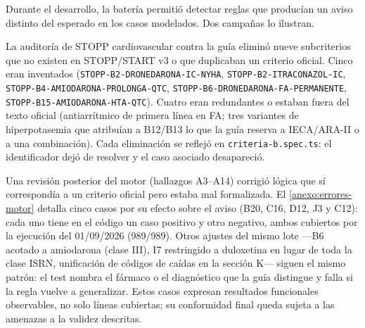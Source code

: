 Durante el desarrollo, la batería permitió detectar reglas que producían un
aviso distinto del esperado en los casos modelados. Dos campañas lo ilustran.

La auditoría de STOPP cardiovascular contra la guía eliminó nueve
subcriterios que no existen en STOPP/START v3 o que duplicaban un
criterio oficial. Cinco eran inventados
(\texttt{STOPP-B2-DRONEDARONA-IC-NYHA}, \texttt{STOPP-B2-ITRACONAZOL-IC},
\texttt{STOPP-B4-AMIODARONA-PROLONGA-QTC},
\texttt{STOPP-B6-DRONEDARONA-FA-PERMANENTE},
\texttt{STOPP-B15-AMIODARONA-HTA-QTC}). Cuatro eran redundantes o
estaban fuera del texto oficial (antiarrítmico de primera línea en FA;
tres variantes de hiperpotasemia que atribuían a B12/B13 lo que la guía
reserva a IECA/ARA-II o a una combinación). Cada eliminación se reflejó
en \texttt{criteria-b.spec.ts}: el identificador dejó de resolver y el
caso asociado desapareció.

Una revisión posterior del motor (hallazgos A3--A14) corrigió lógica que
sí correspondía a un criterio oficial pero estaba mal formalizada. El
\cref{anexo:errores-motor} detalla cinco casos por su efecto sobre el aviso
(B20, C16, D12, J3 y C12): cada uno tiene en el código un caso positivo y
otro negativo, ambos cubiertos por la ejecución del 01/09/2026 (989/989).
Otros
ajustes del mismo lote ---B6 acotado a amiodarona (clase III), I7
restringido a duloxetina en lugar de toda la clase ISRN, unificación de
códigos de caídas en la sección K--- siguen el mismo patrón: el test
nombra el fármaco o el diagnóstico que la guía distingue y falla si la
regla vuelve a generalizar. Estos casos expresan resultados funcionales
observables, no solo líneas cubiertas; su conformidad final queda sujeta a las
amenazas a la validez descritas.
